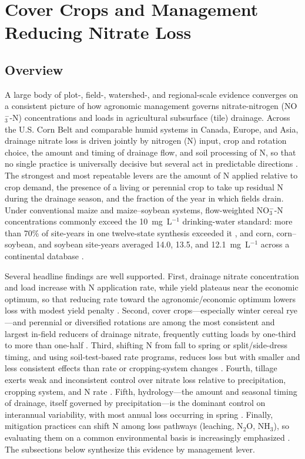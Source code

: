 \documentclass[11pt]{article}
\begin{document}
\section*{Cover Crops and Management Reducing Nitrate Loss}

\subsection{Overview}

A large body of plot-, field-, watershed-, and regional-scale evidence converges on a consistent picture of how agronomic management governs nitrate-nitrogen (NO$_3^-$-N) concentrations and loads in agricultural subsurface (tile) drainage. Across the U.S. Corn Belt and comparable humid systems in Canada, Europe, and Asia, drainage nitrate loss is driven jointly by nitrogen (N) input, crop and rotation choice, the amount and timing of drainage flow, and soil processing of N, so that no single practice is universally decisive but several act in predictable directions \parencite{Dinnes2002}. The strongest and most repeatable levers are the amount of N applied relative to crop demand, the presence of a living or perennial crop to take up residual N during the drainage season, and the fraction of the year in which fields drain. Under conventional maize and maize--soybean systems, flow-weighted NO$_3^-$-N concentrations commonly exceed the 10~mg~L$^{-1}$ drinking-water standard: more than 70\% of site-years in one twelve-state synthesis exceeded it \parencite{Liu2021}, and corn, corn--soybean, and soybean site-years averaged 14.0, 13.5, and 12.1~mg~L$^{-1}$ across a continental database \parencite{Hertzberger2019}.

Several headline findings are well supported. First, drainage nitrate concentration and load increase with N application rate, while yield plateaus near the economic optimum, so that reducing rate toward the agronomic/economic optimum lowers loss with modest yield penalty \parencite{Jaynes2001,Helmers2012b,Zhao2016,Hertzberger2019}. Second, cover crops---especially winter cereal rye---and perennial or diversified rotations are among the most consistent and largest in-field reducers of drainage nitrate, frequently cutting loads by one-third to more than one-half \parencite{Ruffatti2019,OBrien2022,PrezaFontes2021,Daigh2015b,Gentry2025}. Third, shifting N from fall to spring or split/side-dress timing, and using soil-test-based rate programs, reduces loss but with smaller and less consistent effects than rate or cropping-system changes \parencite{Randall2003,Dinnes2002,Jaynes2004}. Fourth, tillage exerts weak and inconsistent control over nitrate loss relative to precipitation, cropping system, and N rate \parencite{RANDALL1995,Weed1996,Randall2001}. Fifth, hydrology---the amount and seasonal timing of drainage, itself governed by precipitation---is the dominant control on interannual variability, with most annual loss occurring in spring \parencite{Randall2003,Bakhsh2010,RANDALL1995}. Finally, mitigation practices can shift N among loss pathways (leaching, N$_2$O, NH$_3$), so evaluating them on a common environmental basis is increasingly emphasized \parencite{PrezaFontes2023,Menegaz2025}. The subsections below synthesize this evidence by management lever.
\end{document}
